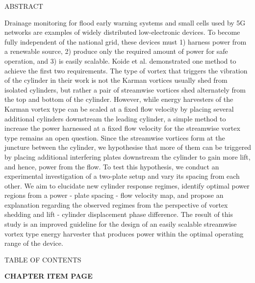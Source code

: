 \documentclass[]{article}
\begin{document}
\protect\hypertarget{_Toc328857619}{}{\protect\hypertarget{_Toc328858959}{}{\protect\hypertarget{_Toc328859064}{}{\protect\hypertarget{_Toc344911337}{}{}}}}

\protect\hypertarget{_Toc461032217}{}{\protect\hypertarget{_Toc461032367}{}{\protect\hypertarget{_Toc461035508}{}{\protect\hypertarget{_Toc461036251}{}{\protect\hypertarget{_Toc461036427}{}{\protect\hypertarget{_Toc461037231}{}{\protect\hypertarget{_Toc461037414}{}{\protect\hypertarget{_Toc483907979}{}{\protect\hypertarget{_Toc41048785}{}{}}}}}}}}}ABSTRACT

Drainage monitoring for flood early warning systems and small cells used
by 5G networks are examples of widely distributed low-electronic
devices. To become fully independent of the national grid, these devices
must 1) harness power from a renewable source, 2) produce only the
required amount of power for safe operation, and 3) is easily scalable.
Koide et al. demonstrated one method to achieve the first two
requirements. The type of vortex that triggers the vibration of the
cylinder in their work is not the Karman vortices usually shed from
isolated cylinders, but rather a pair of streamwise vortices shed
alternately from the top and bottom of the cylinder. However, while
energy harvesters of the Karman vortex type can be scaled at a fixed
flow velocity by placing several additional cylinders downstream the
leading cylinder, a simple method to increase the power harnessed at a
fixed flow velocity for the streamwise vortex type remains an open
question. Since the streamwise vortices form at the juncture between the
cylinder, we hypothesise that more of them can be triggered by placing
additional interfering plates downstream the cylinder to gain more lift,
and hence, power from the flow. To test this hypothesis, we conduct an
experimental investigation of a two-plate setup and vary its spacing
from each other. We aim to elucidate new cylinder response regimes,
identify optimal power regions from a power - plate spacing - flow
velocity map, and propose an explanation regarding the observed regimes
from the perspective of vortex shedding and lift - cylinder displacement
phase difference. The result of this study is an improved guideline for
the design of an easily scalable streamwise vortex type energy harvester
that produces power within the optimal operating range of the device.

\protect\hypertarget{_Toc41048786}{}{}TABLE OF CONTENTS

\textbf{CHAPTER ITEM PAGE}
\end{document}
